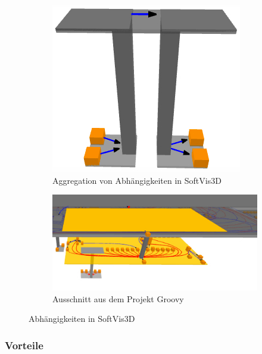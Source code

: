 \begin{figure}[htbp]
	\centering
	\begin{subfigure}[b]{.3\textwidth}
		\centering
		\includegraphics[width=\linewidth]{figures/softvis3d-aggregation}
		\caption{Aggregation von Abhängigkeiten in SoftVis3D} \label{fig:softvis3d-aggregation}
	\end{subfigure}
	\hfill
	\begin{subfigure}[b]{.6\textwidth}
		\centering
		\includegraphics[width=\linewidth]{figures/softvis3d-dependencies}
		\caption{Ausschnitt aus dem Projekt Groovy} \label{fig:softvis3d-groovy}
	\end{subfigure}
	\caption{Abhängigkeiten in SoftVis3D \cite{rinderle2016kontinuierliche}} \label{fig:softvis3d-dependencies}
\end{figure}

\subsubsection*{Vorteile}

